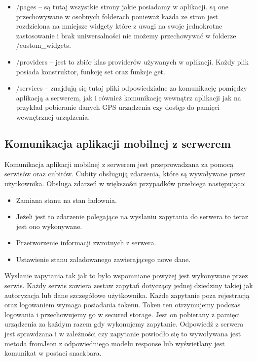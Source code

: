 \documentclass[a4paper,twoside,12pt]{book}
\begin{document}
\begin{itemize}
    \item /pages -- są tutaj wszystkie strony jakie posiadamy w aplikacji. są one przechowywane w osobnych folderach ponieważ każda ze stron jest rozdzielona na mniejsze widgety które z uwagi na swoje jednokrotne zastosowanie i brak uniwersalności nie możemy przechowywać w folderze /custom\_widgets. 

    \item /providers -- jest to zbiór klas providerów używanych w aplikacji. Każdy plik posiada konstruktor, funkcję set oraz funkcje get.

    \item /services -- znajdują się tutaj pliki odpowiedzialne za komunikację pomiędzy aplikacją a serwerem, jak i również komunikację wewnątrz aplikacji jak na przykład pobieranie danych GPS urządzenia czy dostęp do pamięci wewnętrznej urządzenia. 

\end{itemize}

\subsection{Komunikacja aplikacji mobilnej z serwerem}
Komunikacja aplikacji mobilnej z serwerem jest przeprowadzana za pomocą serwisów oraz cubitów. Cubity obsługują zdarzenia, które są wywoływane przez użytkownika. Obsługa zdarzeń w większości przypadków przebiega następująco:
\begin{itemize}
    \item Zamiana stanu na stan ładownia.
    \item Jeżeli jest to zdarzenie polegające na wysłaniu zapytania do serwera to teraz jest ono wykonywane.
    \item Przetworzenie informacji zwrotnych z serwera.
    \item Ustawienie stanu załadowanego zawierającego nowe dane.
\end{itemize}

Wysłanie zapytania tak jak to było wspomniane powyżej jest wykonywane przez serwis. Każdy serwis zawiera zestaw zapytań dotyczący jednej dziedziny takiej jak autoryzacja lub dane szczegółowe użytkownika. Każde zapytanie poza rejestracją oraz logowaniem wymaga posiadania tokenu. Token ten otrzymujemy podczas logowania i przechowujemy go w secured storage. Jest on pobierany z pamięci urządzenia za każdym razem gdy wykonujemy zapytanie. Odpowiedź z serwera jest sprawdzana i w zależności czy zapytanie powiodło się to wywoływana jest metoda fromJson z odpowiedniego modelu response lub wyświetlany jest komunikat w postaci snackbara.
\end{document}
